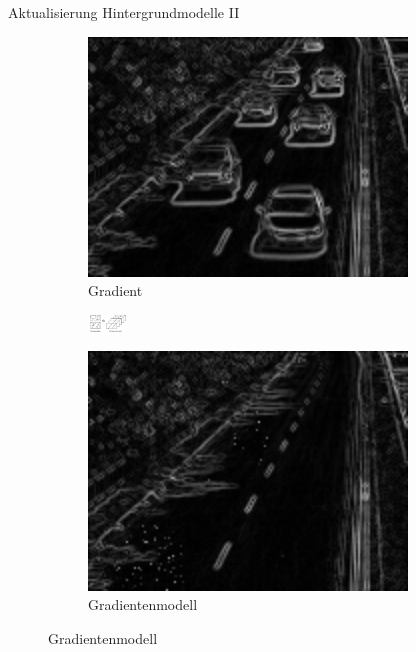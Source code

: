 \documentclass[hyperref={pdfpagelabels=false}]{beamer}
\begin{document}
\begin{frame}{Aktualisierung Hintergrundmodelle II}
\begin{figure}
		\vspace{5mm}
		\begin{subfigure}{.3\linewidth}
			\centering
			\includegraphics[width=\linewidth]{./Bilder/backup_bilder/gradient0823}
			\caption{Gradient}
		\end{subfigure}
		\begin{subfigure}{.3\linewidth}
			\centering
			\includegraphics[width=1cm]{./Bilder/backup_bilder/pfeil.pdf}
		\end{subfigure}
		\begin{subfigure}{.3\linewidth}
			\centering
			\includegraphics[width=\linewidth]{./Bilder/backup_bilder/gradientenmodell0823}
			\caption{Gradientenmodell}
		\end{subfigure}
	\end{figure}
\end{frame}
\end{document}
